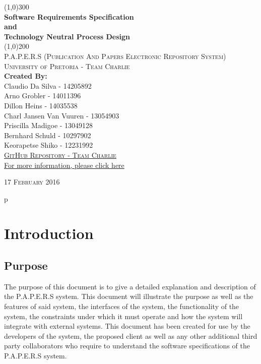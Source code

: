\documentclass{article}
\begin{document}
	\begin{titlepage}
		\begin{center}
		
			\line(1,0){300}\\
			[6mm]
			\huge{
				\bfseries Software Requirements Specification\\
				and\\
				Technology Neutral Process Design
			}\\
			[2mm]
			\line(1,0){200}\\
			[15mm]
			\textsc{\large P.A.P.E.R.S (Publication And Papers Electronic Repository System)}\\
			[7.5mm]
			\textsc{\large University of Pretoria - Team Charlie}\\
			[20mm]
			\large{\textbf{Created By:}}\\
			[2mm]
			\large{
				Claudio Da Silva - 14205892\\
				Arno Grobler - 14011396\\
				Dillon Heins - 14035538\\
				Charl Jansen Van Vuuren - 13054903\\
				Priscilla Madigoe - 13049128\\
				Bernhard Schuld - 10297902\\
				Keorapetse Shiko - 12231992
			}\\
			[4cm]

		\href{https://github.com/DillonHeins/Charlie}{\textsc{\Large GitHub Repository - Team Charlie}\\[2mm]
		  For more information, please click here}
			
		\end{center}	
		\begin{flushright}
			\textsc{\large 17 February 2016}
		\end{flushright}
	\end{titlepage}
	
	\cleardoublepage
	\thispagestyle{empty}p
	\tableofcontents
	\cleardoublepage
	\listoffigures
	\cleardoublepage
	\setcounter{page}{1}
	\section{Introduction}\label{sec:intro}
		\subsection{Purpose}\label{subsec:purpose}
			The purpose of this document is to give a detailed explanation and description of the P.A.P.E.R.S system. This document will illustrate the purpose as well as the features of said system, the interfaces of the system, the functionality of the system, the constraints under which it must operate and how the system will integrate with external systems. This document has been created for use by the developers of the system, the proposed client as well as any other additional third party collaborators who require to understand the software specifications of the P.A.P.E.R.S system.
		
\end{document}
